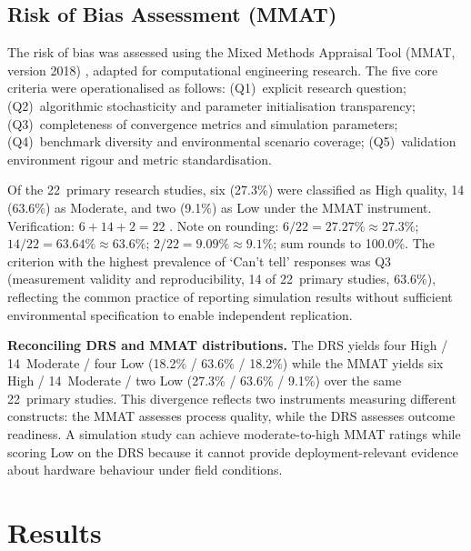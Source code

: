 \documentclass[review,3p]{elsarticle}
\begin{document}
\subsection{Risk of Bias Assessment (MMAT)}
\label{subsec:mmat}

The risk of bias was assessed using the Mixed Methods Appraisal Tool
(MMAT, version 2018) \cite{hong2018}, adapted for computational engineering
research. The five core criteria were operationalised as follows:
(Q1)~explicit research question; (Q2)~algorithmic stochasticity and parameter
initialisation transparency; (Q3)~completeness of convergence metrics and
simulation parameters; (Q4)~benchmark diversity and environmental scenario
coverage; (Q5)~validation environment rigour and metric standardisation.

Of the 22~primary research studies, six (27.3\%) were classified as High
quality, 14 (63.6\%) as Moderate, and two (9.1\%) as Low under the MMAT
instrument. Verification: $6+14+2=22$ \checkmark. Note on rounding: $6/22=27.27\%
\approx 27.3\%$; $14/22=63.64\% \approx 63.6\%$; $2/22=9.09\% \approx 9.1\%$;
sum rounds to 100.0\%. The criterion with the highest prevalence of `Can't
tell' responses was Q3 (measurement validity and reproducibility, 14 of
22~primary studies, 63.6\%), reflecting the common practice of reporting simulation
results without sufficient environmental specification to enable independent
replication.

\textbf{Reconciling DRS and MMAT distributions.} The DRS yields
four High / 14~Moderate / four Low (18.2\% / 63.6\% / 18.2\%) while the
MMAT yields six High / 14~Moderate / two Low (27.3\% / 63.6\% / 9.1\%)
over the same 22~primary studies. This divergence reflects two instruments
measuring different constructs: the MMAT assesses process quality, while the
DRS assesses outcome readiness. A simulation study can achieve moderate-to-high
MMAT ratings while scoring Low on the DRS because it cannot provide
deployment-relevant evidence about hardware behaviour under field conditions.


\section{Results}
\end{document}
